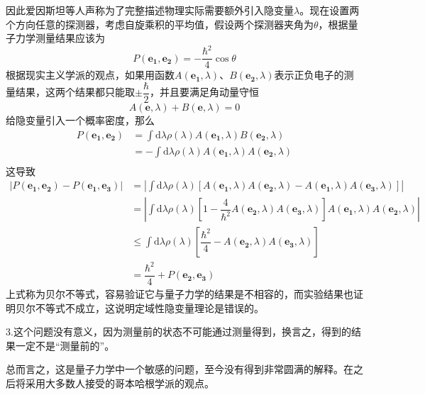 \documentclass[12pt, a4paper, oneside]{ctexart}
\begin{document}
	因此爱因斯坦等人声称为了完整描述物理实际需要额外引入隐变量$\lambda$。现在设置两个方向任意的探测器，考虑自旋乘积的平均值，假设两个探测器夹角为$\theta$，根据量子力学测量结果应该为
	\begin{equation}
		P(\boldsymbol{e_{1}},\boldsymbol{e_{2}})=-\dfrac{\hbar^{2}}{4}\cos\theta
	\end{equation}
	\quad\quad 根据现实主义学派的观点，如果用函数$A(\boldsymbol{e_{1}},\lambda)$、$B(\boldsymbol{e_{2}},\lambda)$表示正负电子的测量结果，这两个结果都只能取$\pm \dfrac{\hbar}{2}$，并且要满足角动量守恒
	\begin{equation}
		A(\boldsymbol{e},\lambda)+B(\boldsymbol{e},\lambda)=0
	\end{equation}
	\quad\quad 给隐变量引入一个概率密度，那么
	\begin{align}
		P(\boldsymbol{e_{1}},\boldsymbol{e_{2}})&=\int\mathrm{d}\lambda\rho(\lambda)A(\boldsymbol{e_{1}},\lambda)B(\boldsymbol{e_{2}},\lambda)\\
		&=-\int\mathrm{d}\lambda\rho(\lambda)A(\boldsymbol{e_{1}},\lambda)A(\boldsymbol{e_{2}},\lambda)\\
	\end{align}
	\quad\quad 这导致
	\begin{align}
		\left|P(\boldsymbol{e_{1}},\boldsymbol{e_{2}})-P(\boldsymbol{e_{1}},\boldsymbol{e_{3}})\right|&=\left|\int\mathrm{d}\lambda\rho(\lambda)\left[A(\boldsymbol{e_{1}},\lambda)A(\boldsymbol{e_{2}},\lambda)-A(\boldsymbol{e_{1}},\lambda)A(\boldsymbol{e_{3}},\lambda)\right]\right|\\
		&=\left|\int\mathrm{d}\lambda\rho(\lambda)\left[1-\dfrac{4}{\hbar^{2}}A(\boldsymbol{e_{2}},\lambda)A(\boldsymbol{e_{3}},\lambda)\right]A(\boldsymbol{e_{1}},\lambda)A(\boldsymbol{e_{2}},\lambda)\right|\\
		&\le\int\mathrm{d}\lambda\rho(\lambda)\left[\dfrac{\hbar^{2}}{4}-A(\boldsymbol{e_{2}},\lambda)A(\boldsymbol{e_{3}},\lambda)\right]\\
		&=\dfrac{\hbar^{2}}{4}+P(\boldsymbol{e_{2}},\boldsymbol{e_{3}})
	\end{align}
	\quad\quad 上式称为贝尔不等式，容易验证它与量子力学的结果是不相容的，而实验结果也证明贝尔不等式不成立，这说明定域性隐变量理论是错误的。\par 
	3.这个问题没有意义，因为测量前的状态不可能通过测量得到，换言之，得到的结果一定不是“测量前的”。\par 
	总而言之，这是量子力学中一个敏感的问题，至今没有得到非常圆满的解释。在之后将采用大多数人接受的哥本哈根学派的观点。\par 
\end{document}
